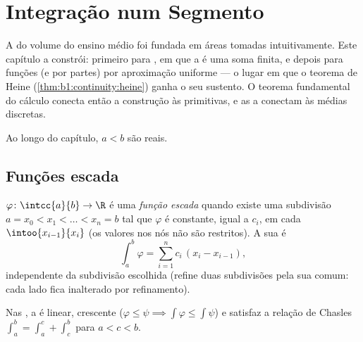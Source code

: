 \chapter{Integração num Segmento}\label{ch:b1:integration}

A  do volume do ensino médio foi fundada em áreas tomadas
intuitivamente. Este capítulo a constrói: primeiro para ,
em que a  é uma soma finita, e depois para funções  (e
 por partes) por aproximação uniforme --- o
lugar em que o teorema de Heine (\cref{thm:b1:continuity:heine}) ganha o
seu sustento. O teorema fundamental do cálculo conecta então a
construção às primitivas, e as  a conectam às médias
discretas.

Ao longo do capítulo, $a < b$ são reais.

\section{Funções escada}

\begin{definition}\label{def:b1:integration:step}
$\varphi \colon \intcc{a}{b} \to \R$ é uma \emph{função
escada} quando existe uma subdivisão $a = x_0
< x_1 < \dots < x_n = b$ tal que $\varphi$ é constante, igual a
$c_i$, em cada   $\intoo{x_{i-1}}{x_i}$ (os valores nos
nós não são restritos). A sua  é
\[
\int_a^b \varphi = \sum_{i=1}^{n} c_i\,(x_i - x_{i-1}),
\]
independente da subdivisão escolhida (refine duas subdivisões pela
sua comum: cada lado fica inalterado por refinamento).
\end{definition}

\begin{proposition}\label{prop:b1:integration:stepprops}
Nas , a  é linear, crescente ($\varphi \leq
\psi \implies \int\varphi \leq \int\psi$) e satisfaz a relação de Chasles
$\int_a^b = \int_a^c + \int_c^b$ para $a < c < b$.
\end{proposition}

